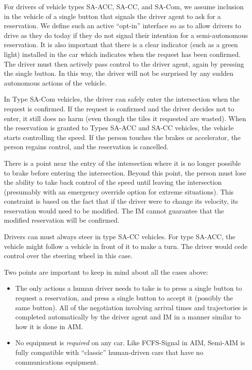 For drivers of vehicle types SA-ACC, SA-CC, and SA-Com, we assume
inclusion in the vehicle of a single button that signals the driver
agent to ask for a reservation.  We define such an active ``opt-in''
interface so as to allow drivers to drive as they do today if they do
not signal their intention for a semi-autonomous reservation.  It is
also important that there is a clear indicator (such as a green light)
installed in the car which indicates when the request has been
confirmed.  The driver must then actively pass control to the driver
agent, again by pressing the single button.  In this way, the driver
will not be surprised by any sudden autonomous actions of the vehicle.

In Type SA-Com vehicles, the driver can safely enter the intersection
when the request is confirmed. If the request is confirmed and the
driver decides not to enter, it still does no harm (even though the
tiles it requested are wasted).  When the reservation is granted to
Types SA-ACC and SA-CC vehicles, the vehicle starts controlling the
speed.  If the person touches the brakes or accelerator, the person
regains control, and the reservation is cancelled.

There is a point near the entry of the intersection where it is no
longer possible to brake before entering the intersection. Beyond this
point, the person must lose the ability to take back control of the
speed until leaving the intersection (presumably with an emergency
override option for extreme situations).  This constraint is based on
the fact that if the driver were to change its velocity, its
reservation would need to be modified.  The IM cannot guarantee that
the modified reservation will be confirmed.

Drivers can must always steer in type SA-CC vehicles. For type SA-ACC,
the vehicle might follow a vehicle in front of it to make a turn. The
driver would cede control over the steering wheel in this case.

Two points are important to keep in mind about all the cases above:
\begin{itemize}

\item The only actions a human driver needs to take is to press a
single button to request a reservation, and press a single button to
accept it (possibly the same button).  All of the negotiation
involving arrival times and trajectories is completed automatically by
the driver agent and IM in a manner similar to how it is done in AIM.

\item No equipment is \emph{required} on any car.  Like FCFS-Signal in
AIM, Semi-AIM is fully compatible with ``classic'' human-driven cars
that have no communications equipment.
\end{itemize}

